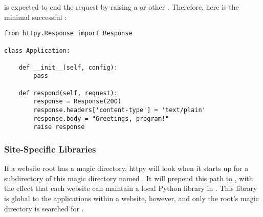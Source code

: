  is expected to end the request by raising a
 or other . Therefore, here is the minimal
successful :

\begin{verbatim}
from httpy.Response import Response

class Application:

    def __init__(self, config):
        pass

    def respond(self, request):
        response = Response(200)
        response.headers['content-type'] = 'text/plain'
        response.body = "Greetings, program!"
        raise response

\end{verbatim}



\subsubsection{Site-Specific Libraries}

If a website root has a magic directory, httpy will look when it starts up for a
subdirectory of this magic directory named . It will prepend
this path to , with the effect that each website can maintain a
local Python library in . This library is
global to the applications within a website, however, and only the root's magic
directory is searched for .


